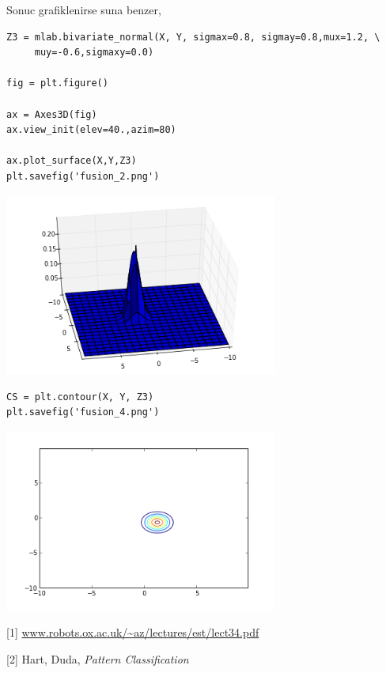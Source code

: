 \documentclass[12pt,fleqn]{article}\usepackage{../common}
\begin{document}
Sonuc grafiklenirse suna benzer,

\begin{verbatim}
Z3 = mlab.bivariate_normal(X, Y, sigmax=0.8, sigmay=0.8,mux=1.2, \
     muy=-0.6,sigmaxy=0.0)

fig = plt.figure()

ax = Axes3D(fig)
ax.view_init(elev=40.,azim=80)

ax.plot_surface(X,Y,Z3)
plt.savefig('fusion_2.png')
\end{verbatim}


\includegraphics[height=6cm]{fusion_2.png}

\begin{verbatim}
CS = plt.contour(X, Y, Z3)
plt.savefig('fusion_4.png')
\end{verbatim}

\includegraphics[height=6cm]{fusion_4.png}


[1] \url{www.robots.ox.ac.uk/~az/lectures/est/lect34.pdf}

[2] Hart, Duda, {\em Pattern Classification}
\end{document}
